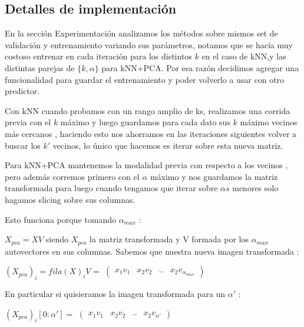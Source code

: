 \subsection{Detalles de implementación }

En la sección Experimentación analizamos los métodos sobre mismos set de validación y entrenamiento variando sus parámetros, notamos que se hacía muy costoso entrenar en cada iteración para los distintos $k$ en el caso de kNN,y las distintas parejas de  $\{ k, \alpha\}$ para kNN+PCA. Por esa razón decidimos agregar una funcionalidad para guardar el entrenamiento y poder volverlo a usar con otro predictor.
\par
Con kNN cuando probamos con un rango amplio de ks, realizamos una corrida previa con el $k$ máximo y luego guardamos para cada dato sus $k$ máximo vecinos más cercanos , haciendo esto nos ahorramos en las iteraciones siguientes volver a buscar los $k'$ vecinos, lo único que hacemos es iterar sobre esta nueva matriz.
\par
Para kNN+PCA mantenemos la modalidad previa con respecto a los vecinos , pero además corremos primero con el $\alpha $ máximo y nos guardamos la matriz transformada para luego cuando tengamos que iterar sobre $\alpha s $ menores solo hagamos slicing sobre sus columnas.
\par
Esto funciona porque tomando $\alpha_{max}$  :
\par
$X_{pca} = XV  $ siendo $X_{pca}$ la matriz transformada y V formada por los $\alpha_{max}$ autovectores en sus columnas.
Sabemos que nuestra nueva imagen transformada :
\par 

$(X_{pca})_i = fila(X)_iV =$ 
$
\begin{pmatrix}
x_1v_1 & x_2v_2 & ..& x_2v_{\alpha_{max}}
\end{pmatrix}
$
\par

En particular si quisieramos la imagen transformada para un $\alpha'$ :
\par

$(X_{pca})_i[0:\alpha'] = $
$
\begin{pmatrix}
x_1v_1 & x_2v_2 & ..& x_2v_{\alpha'}
\end{pmatrix}
$










